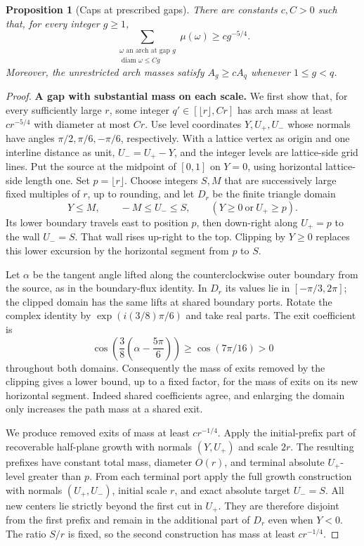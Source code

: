 \documentclass[11pt]{article}
\numberwithin{equation}{section}
\newtheorem*{unnumberedproposition}{Proposition}
\theoremstyle{definition}\newtheorem{definition}[theorem]{Definition}
\theoremstyle{remark}\newtheorem{remark}[theorem]{Remark}
\begin{document}
\begin{unnumberedproposition}[Caps at prescribed gaps]
\label{L:prop:caps}
There are constants $c,C>0$ such that, for every integer $g\ge1$,
\[
 \sum_{\substack{\omega\text{ an arch at gap }g\\
                  \operatorname{diam}\omega\le Cg}}
       \mu(\omega)\ge c g^{-5/4}.
\]
Moreover, the unrestricted arch masses satisfy
$A_g\ge c A_q$ whenever $1\le g<q$.
\end{unnumberedproposition}
\begin{proof}
  \textbf{A gap with substantial mass on each scale.}
We first show that, for every sufficiently large $r$, some integer
$q'\in[\lfloor r\rfloor,Cr]$ has arch mass at least $cr^{-5/4}$
with diameter at most $Cr$.
Use level coordinates $Y,U_+,U_-$ whose normals have angles
$\pi/2,\pi/6,-\pi/6$, respectively.  With a lattice vertex as origin
and one interline distance as unit, $U_-=U_+-Y$, and the integer levels
are lattice-side grid lines.  Put the source at the midpoint of
$[0,1]$ on $Y=0$, using horizontal lattice-side length one.  Set
$p=\lfloor r\rfloor$.  Choose integers $S,M$ that are successively
large fixed multiples of $r$, up to rounding, and let $D_r$ be the
finite triangle domain
\[
 Y\le M,\qquad -M\le U_-\le S,\qquad
 (Y\ge0\ \text{or}\ U_+\ge p).
\]
Its lower boundary travels east to position $p$, then down-right
along $U_+=p$ to the wall $U_-=S$.  That wall rises up-right to the
top.  Clipping by $Y\ge0$ replaces this lower excursion by the
horizontal segment from $p$ to $S$.

Let $\alpha$ be the tangent angle lifted along the counterclockwise
outer boundary from the source, as in the boundary-flux identity.
In $D_r$ its values lie in $[-\pi/3,2\pi]$; the clipped domain has
the same lifts at shared boundary ports.  Rotate the complex identity
by $\exp(i(3/8)\pi/6)$ and take real parts.  The exit coefficient is
\[
 \cos\!\left(\frac38\left(\alpha-\frac{5\pi}{6}\right)\right)
 \ge\cos(7\pi/16)>0
\]
throughout both domains.  Consequently the mass of exits removed by
the clipping gives a lower bound, up to a fixed factor, for the mass
of exits on its new horizontal segment.  Indeed shared coefficients
agree, and enlarging the domain only increases the path mass at a
shared exit.

We produce removed exits of mass at least $cr^{-1/4}$.  Apply the
initial-prefix part of recoverable half-plane growth with normals
$(Y,U_+)$ and scale $2r$.  The resulting prefixes have constant total
mass, diameter $O(r)$, and terminal absolute $U_+$-level greater
than $p$.  From each terminal port apply the full growth construction
with normals $(U_+,U_-)$, initial scale $r$, and exact absolute target
$U_-=S$.  All new centers lie strictly beyond the first cut in $U_+$.
They are therefore disjoint from the first prefix and remain in the
additional part of $D_r$ even when $Y<0$.  The ratio $S/r$ is fixed,
so the second construction has mass at least $cr^{-1/4}$.


\end{proof}
\end{document}
